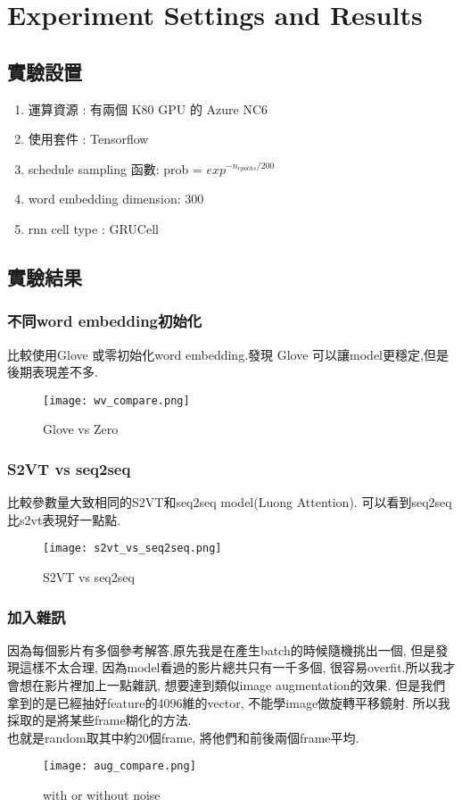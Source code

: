 \documentclass[12pt, a4paper]{article}
\begin{document}
	\section{Experiment Settings and Results}
		\subsection{實驗設置}
			\begin{enumerate}
				\item 運算資源 : 有兩個 K80 GPU 的 Azure NC6 
				\item 使用套件 : Tensorflow
				\item schedule sampling 函數: prob = $exp^{-n_{epochs}/200}$
				\item word embedding dimension: 300
				\item rnn cell type : GRUCell
			\end{enumerate}
		\subsection{實驗結果}
			\subsubsection{不同word embedding初始化}
				比較使用Glove 或零初始化word embedding.發現 Glove 可以讓model更穩定,但是後期表現差不多.
				\begin{figure}[h!]
					\centering
					\texttt{[image: wv\_compare.png]}
					\caption{Glove vs Zero} 
				\end{figure}
			\subsubsection{S2VT vs seq2seq}
				比較參數量大致相同的S2VT和seq2seq model(Luong Attention).
				可以看到seq2seq比s2vt表現好一點點.
				\begin{figure}[h]
					\centering
					\texttt{[image: s2vt\_vs\_seq2seq.png]}
					\caption{S2VT vs seq2seq} 
				\end{figure}
			\subsubsection{加入雜訊}
				因為每個影片有多個參考解答,原先我是在產生batch的時候隨機挑出一個, 但是發現這樣不太合理, 因為model看過的影片總共只有一千多個, 很容易overfit.所以我才會想在影片裡加上一點雜訊, 想要達到類似image augmentation的效果.
				但是我們拿到的是已經抽好feature的4096維的vector, 不能學image做旋轉平移鏡射. 所以我採取的是將某些frame糊化的方法.\\
				也就是random取其中約20個frame, 將他們和前後兩個frame平均.\\
				\begin{figure}[h!]
					\centering
					\texttt{[image: aug\_compare.png]}
					\caption{with or without noise} 
				\end{figure}
				
\end{document}
